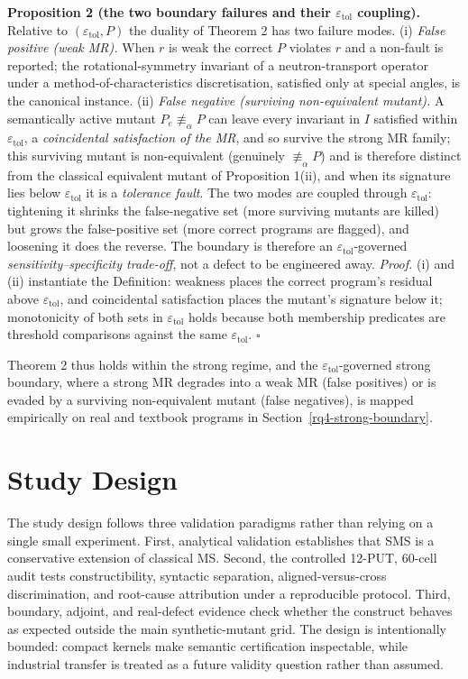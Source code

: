 \documentclass[12pt]{article}
\begin{document}
\textbf{Proposition 2 (the two boundary failures and their
$\varepsilon_{\mathrm{tol}}$ coupling).} Relative to
$(\varepsilon_{\mathrm{tol}}, P)$ the duality of Theorem 2 has two
failure modes. (i) \emph{False positive (weak MR).} When $r$ is weak the
correct $P$ violates $r$ and a non-fault is reported; the
rotational-symmetry invariant of a neutron-transport operator under a
method-of-characteristics discretisation, satisfied only at special
angles, is the canonical instance. (ii) \emph{False negative (surviving
non-equivalent mutant).} A semantically active mutant
$P_e \not\equiv_\alpha P$ can leave every invariant in $I$ satisfied
within $\varepsilon_{\mathrm{tol}}$, a \emph{coincidental satisfaction
of the MR}, and so survive the strong MR family; this surviving mutant
is non-equivalent (genuinely $\not\equiv_\alpha P$) and is therefore
distinct from the classical equivalent mutant of Proposition 1(ii), and
when its signature lies below $\varepsilon_{\mathrm{tol}}$ it is a
\emph{tolerance fault}. The two modes are coupled through
$\varepsilon_{\mathrm{tol}}$: tightening it shrinks the false-negative
set (more surviving mutants are killed) but grows the false-positive set
(more correct programs are flagged), and loosening it does the reverse.
The boundary is therefore an $\varepsilon_{\mathrm{tol}}$-governed
\emph{sensitivity--specificity trade-off}, not a defect to be engineered
away. \emph{Proof.} (i) and (ii) instantiate the Definition: weakness
places the correct program's residual above $\varepsilon_{\mathrm{tol}}$,
and coincidental satisfaction places the mutant's signature below it;
monotonicity of both sets in $\varepsilon_{\mathrm{tol}}$ holds because
both membership predicates are threshold comparisons against the same
$\varepsilon_{\mathrm{tol}}$. $\square$

Theorem 2 thus holds within the strong regime, and the
$\varepsilon_{\mathrm{tol}}$-governed strong boundary, where a strong
MR degrades into a weak MR (false positives) or is evaded by a surviving
non-equivalent mutant (false negatives), is mapped empirically on real
and textbook programs in Section~\ref{rq4-strong-boundary}.


\section{Study Design}\label{experimental-subjects-and-operator-framework}

The study design follows three validation paradigms rather than relying
on a single small experiment. First, analytical validation establishes
that SMS is a conservative extension of classical MS. Second, the
controlled 12-PUT, 60-cell audit tests constructibility, syntactic
separation, aligned-versus-cross discrimination, and root-cause
attribution under a reproducible protocol. Third, boundary, adjoint, and
real-defect evidence check whether the construct behaves as expected
outside the main synthetic-mutant grid. The design is intentionally
bounded: compact kernels make semantic certification inspectable, while
industrial transfer is treated as a future validity question rather than
assumed.
\end{document}

